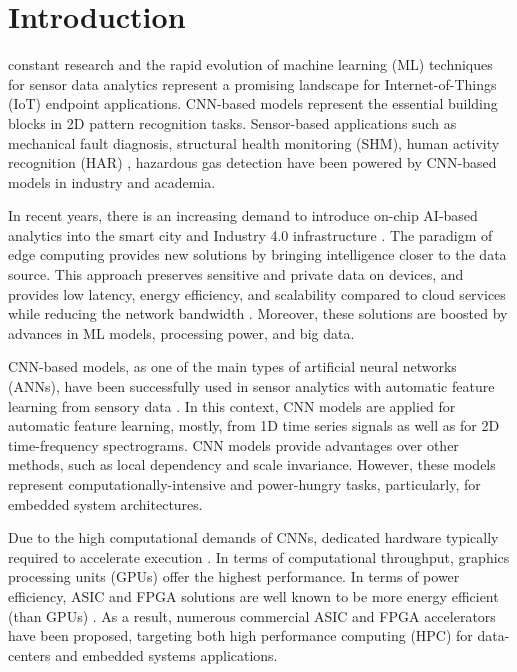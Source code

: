 
\section{Introduction}
\label{sec:introduction}

 constant research and the rapid evolution of machine learning (ML) techniques for sensor data analytics represent a promising landscape for  Internet-of-Things (IoT) endpoint applications. CNN-based models represent the essential building blocks in 2D pattern recognition tasks. Sensor-based applications such as mechanical fault diagnosis\cite{li2019sensor,dong2018rolling}, structural health monitoring (SHM)\cite{nagayama2007structural}, human activity recognition (HAR) \cite{wang2019deep}, hazardous gas detection\cite{kim2017hazardous} have been powered by CNN-based models in industry and academia.

\REVIEW
{
In recent years, there is an increasing demand to introduce on-chip AI-based analytics into the smart city and Industry 4.0 infrastructure \mbox{\cite{lom2016industry}}. The paradigm of edge computing provides new solutions by bringing intelligence closer to the data source. This approach preserves sensitive and private data on devices, and provides low latency, energy efficiency, and scalability compared to cloud services while reducing the network bandwidth \mbox{\cite{chen2019deep}}. Moreover, these solutions are boosted by advances in ML models, processing power, and big data.

CNN-based models, as one of the main types of artificial neural networks (ANNs),
have been successfully used in sensor analytics with automatic feature learning from sensory data \mbox{\cite{ince2016real, janssens2016convolutional, abdeljaber2017real, guo2016hierarchical}}. In this context, CNN models are applied for automatic feature learning, mostly, from 1D time series signals as well as for 2D time-frequency spectrograms. CNN models provide advantages over other methods, such as local dependency and scale invariance. However, these models represent computationally-intensive and power-hungry tasks, particularly, for embedded system architectures.
}

Due to the high computational demands of CNNs, dedicated hardware  typically required to accelerate execution . In terms of computational throughput, graphics processing units (GPUs) offer the highest performance. In terms of power efficiency, ASIC and FPGA solutions are well known to be more energy efficient (than GPUs) \cite{nurvitadhi2017can}. As a result, numerous commercial ASIC and FPGA accelerators have been proposed, targeting both high performance computing (HPC) for data-centers and embedded systems applications.

